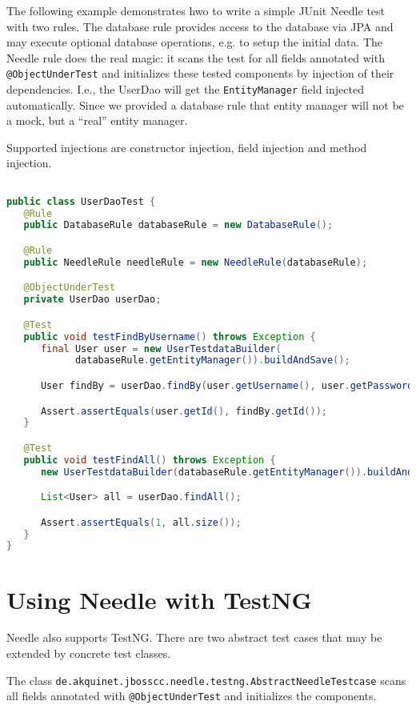 The following example demonstrates hwo to write a simple JUnit Needle test with two rules.
The database rule provides access to the database via JPA and may execute optional database operations, e.g. to setup the initial data.
The Needle rule does the real magic: it scans the test for all fields annotated with \verb|@ObjectUnderTest| and initializes these tested components
by injection of their dependencies. I.e., the UserDao will get the \verb|EntityManager| field injected automatically. Since we provided a database rule
that entity manager will not be a mock, but a ``real'' entity manager.

Supported injections are constructor injection, field injection and method injection.

\begin{lstlisting}[language={JAVA},caption=JUnit User DAO test]

public class UserDaoTest {
   @Rule
   public DatabaseRule databaseRule = new DatabaseRule();

   @Rule
   public NeedleRule needleRule = new NeedleRule(databaseRule);

   @ObjectUnderTest
   private UserDao userDao;

   @Test
   public void testFindByUsername() throws Exception {
      final User user = new UserTestdataBuilder(
            databaseRule.getEntityManager()).buildAndSave();

      User findBy = userDao.findBy(user.getUsername(), user.getPassword());

      Assert.assertEquals(user.getId(), findBy.getId());
   }

   @Test
   public void testFindAll() throws Exception {
      new UserTestdataBuilder(databaseRule.getEntityManager()).buildAndSave();

      List<User> all = userDao.findAll();

      Assert.assertEquals(1, all.size());
   }
}
\end{lstlisting}

\section{Using Needle with TestNG}
\label{sec: TestNG}

Needle also supports TestNG. There are two abstract test cases that may be extended by concrete test classes.

The class \verb|de.akquinet.jbosscc.needle.testng.AbstractNeedleTestcase| scans all fields
annotated with \verb|@ObjectUnderTest| and initializes the components.

